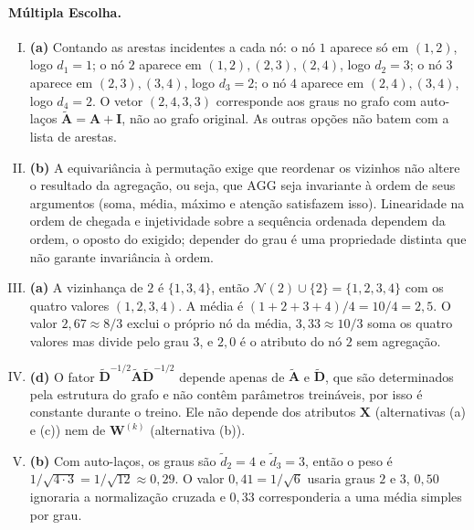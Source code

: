 \documentclass{dlproblemset}
\begin{document}
\paragraph{Múltipla Escolha.}
\begin{enumerate}[I)]
    \item \textbf{(a)} Contando as arestas incidentes a cada nó: o nó $1$ aparece só em $(1,2)$, logo $d_1 = 1$; o nó $2$ aparece em $(1,2),(2,3),(2,4)$, logo $d_2 = 3$; o nó $3$ aparece em $(2,3),(3,4)$, logo $d_3 = 2$; o nó $4$ aparece em $(2,4),(3,4)$, logo $d_4 = 2$. O vetor $(2,4,3,3)$ corresponde aos graus no grafo com auto-laços $\tilde{\mathbf{A}} = \mathbf{A} + \mathbf{I}$, não ao grafo original. As outras opções não batem com a lista de arestas.

    \item \textbf{(b)} A equivariância à permutação exige que reordenar os vizinhos não altere o resultado da agregação, ou seja, que $\mathrm{AGG}$ seja invariante à ordem de seus argumentos (soma, média, máximo e atenção satisfazem isso). Linearidade na ordem de chegada e injetividade sobre a sequência ordenada dependem da ordem, o oposto do exigido; depender do grau é uma propriedade distinta que não garante invariância à ordem.

    \item \textbf{(a)} A vizinhança de $2$ é $\{1,3,4\}$, então $\mathcal{N}(2) \cup \{2\} = \{1,2,3,4\}$ com os quatro valores $(1,2,3,4)$. A média é $(1+2+3+4)/4 = 10/4 = 2{,}5$. O valor $2{,}67 \approx 8/3$ exclui o próprio nó da média, $3{,}33 \approx 10/3$ soma os quatro valores mas divide pelo grau $3$, e $2{,}0$ é o atributo do nó $2$ sem agregação.

    \item \textbf{(d)} O fator $\tilde{\mathbf{D}}^{-1/2} \tilde{\mathbf{A}} \tilde{\mathbf{D}}^{-1/2}$ depende apenas de $\tilde{\mathbf{A}}$ e $\tilde{\mathbf{D}}$, que são determinados pela estrutura do grafo e não contêm parâmetros treináveis, por isso é constante durante o treino. Ele não depende dos atributos $\mathbf{X}$ (alternativas (a) e (c)) nem de $\mathbf{W}^{(k)}$ (alternativa (b)).

    \item \textbf{(b)} Com auto-laços, os graus são $\tilde d_2 = 4$ e $\tilde d_3 = 3$, então o peso é $1/\sqrt{4 \cdot 3} = 1/\sqrt{12} \approx 0{,}29$. O valor $0{,}41 = 1/\sqrt{6}$ usaria graus $2$ e $3$, $0{,}50$ ignoraria a normalização cruzada e $0{,}33$ corresponderia a uma média simples por grau.


\end{enumerate}
\end{document}
